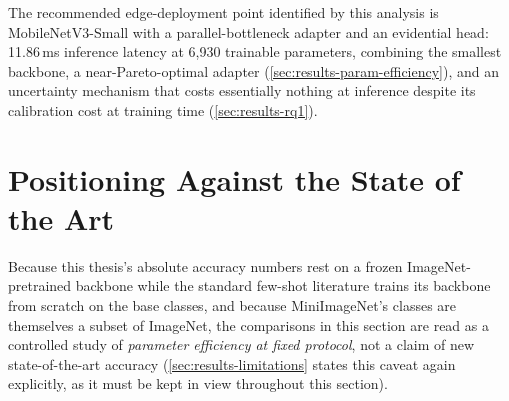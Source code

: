 \documentclass{iutbscthesis}
\begin{document}
The recommended edge-deployment point identified by this analysis is MobileNetV3-Small with a parallel-bottleneck adapter and an evidential head: 11.86\,ms inference latency at 6{,}930 trainable parameters, combining the smallest backbone, a near-Pareto-optimal adapter (\autoref{sec:results-param-efficiency}), and an uncertainty mechanism that costs essentially nothing at inference despite its calibration cost at training time (\autoref{sec:results-rq1}).

\section{Positioning Against the State of the Art}
\label{sec:results-positioning}

Because this thesis's absolute accuracy numbers rest on a frozen ImageNet-pretrained backbone while the standard few-shot literature trains its backbone from scratch on the base classes, and because MiniImageNet's classes are themselves a subset of ImageNet, the comparisons in this section are read as a controlled study of \emph{parameter efficiency at fixed protocol}, not a claim of new state-of-the-art accuracy (\autoref{sec:results-limitations} states this caveat again explicitly, as it must be kept in view throughout this section).
\end{document}

